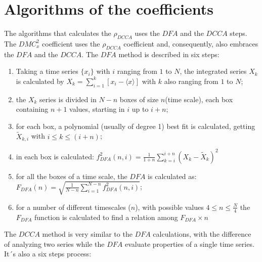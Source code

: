 \documentclass[article]{jss}
\begin{document}
\section{Algorithms of the coefficients}\label{sec:calculations}

The algorithms that calculates the $\rho_{DCCA}$ uses the $DFA$ and the $DCCA$ steps. The $DMC_x^2$ coefficient uses the $\rho_{DCCA}$ coefficient and, consequently, also embraces the $DFA$ and the $DCCA$. The $DFA$ method is described in six steps:


\begin{enumerate}\label{steps:dfa}

  \item Taking a time series $\{x_{i}\}$ with $i$ ranging from $1$ to $N$, the integrated series $X_{k}$ is calculated by $X_{k} = \sum_{i=1}^{k}\left[x_{i} - \langle x \rangle \right]$ with \(k\) also ranging from $1$ to $N$;
  \item the  $X_{k}$ series is divided in $N - n$ boxes of size $n$(time scale), each box containing $n + 1$ values, starting in $i$ up to $i + n$;
  \item for each box, a polynomial (usually of degree 1) best fit is calculated, getting $\widetilde{X}_{k, i}$ with $i \le k \le (i + n)$;
  \item in each box is calculated: $f_{DFA}^{2}(n, i) = \frac{1}{1+n} \sum_{k=i}^{i + n}(X_{k}-\widetilde{X}_{k})^{2}$
  \item for all the boxes of a time scale, the $DFA$ is calculated as:\\[10pt]
        $F_{DFA}(n) = \sqrt{\frac{1}{N - n} \sum_{i=1}^{N-n} f_{DFA}^{2}(n, i)}$;
  \item for a number of different timescales ($n$), with possible values $4 \le n \le \frac{N}{4}$ the $F_{DFA}$ function is calculated to find a relation among $F_{DFA} \times n$

\end{enumerate}


The $DCCA$ method is very similar to the $DFA$ calculations, with the difference of analyzing two series while the $DFA$ evaluate properties of a single time series. It´s also a six steps process:
\end{document}
